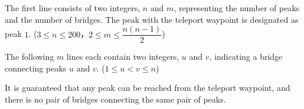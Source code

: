The first line consists of two integers, $n$ and $m$, representing the number of peaks and the number of bridges. The peak with the teleport waypoint is designated as peak $1$. ($3 \le n \le 200$，$2 \le m \le \dfrac{n(n - 1)}{2}$)

The following $m$ lines each contain two integers, $u$ and $v$, indicating a bridge connecting peaks $u$ and $v$. ($1 \le u < v \le n$)

It is guaranteed that any peak can be reached from the teleport waypoint, and there is no pair of bridges connecting the same pair of peaks.